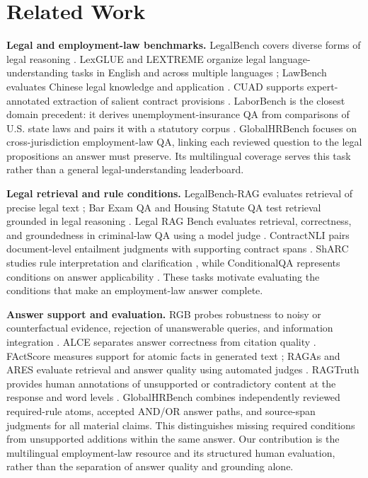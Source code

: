 \documentclass[11pt]{article}
\DeclareRobustCommand{\claim}[2]{#2}
\begin{document}
\section{Related Work}
\claim{RELATED}{\textbf{Legal and employment-law benchmarks.} LegalBench covers diverse forms of legal reasoning \citep{guha2023legalbench}. LexGLUE and LEXTREME organize legal language-understanding tasks in English and across multiple languages \citep{chalkidis2022lexglue,niklaus2023lextreme}; LawBench evaluates Chinese legal knowledge and application \citep{fei2024lawbench}. CUAD supports expert-annotated extraction of salient contract provisions \citep{hendrycks2021cuad}. LaborBench is the closest domain precedent: it derives unemployment-insurance QA from comparisons of U.S. state laws and pairs it with a statutory corpus \citep{hariri2025laborbench}. GlobalHRBench focuses on cross-jurisdiction employment-law QA, linking each reviewed question to the legal propositions an answer must preserve. Its multilingual coverage serves this task rather than a general legal-understanding leaderboard.}

\claim{RELATED}{\textbf{Legal retrieval and rule conditions.} LegalBench-RAG evaluates retrieval of precise legal text \citep{pipitone2024legalbenchrag}; Bar Exam QA and Housing Statute QA test retrieval grounded in legal reasoning \citep{zheng2025legalretrieval}. Legal RAG Bench evaluates retrieval, correctness, and groundedness in criminal-law QA using a model judge \citep{butler2026legalragbench}. ContractNLI pairs document-level entailment judgments with supporting contract spans \citep{koreeda2021contractnli}. ShARC studies rule interpretation and clarification \citep{saeidi2018interpretation}, while ConditionalQA represents conditions on answer applicability \citep{sun2022conditionalqa}. These tasks motivate evaluating the conditions that make an employment-law answer complete.}

\claim{RELATED}{\textbf{Answer support and evaluation.} RGB probes robustness to noisy or counterfactual evidence, rejection of unanswerable queries, and information integration \citep{chen2024rgb}. ALCE separates answer correctness from citation quality \citep{gao2023alce}. FActScore measures support for atomic facts in generated text \citep{min2023factscore}; RAGAs and ARES evaluate retrieval and answer quality using automated judges \citep{es2024ragas,saadfalcon2024ares}. RAGTruth provides human annotations of unsupported or contradictory content at the response and word levels \citep{niu2024ragtruth}. GlobalHRBench combines independently reviewed required-rule atoms, accepted AND/OR answer paths, and source-span judgments for all material claims. This distinguishes missing required conditions from unsupported additions within the same answer. Our contribution is the multilingual employment-law resource and its structured human evaluation, rather than the separation of answer quality and grounding alone.}
\end{document}
